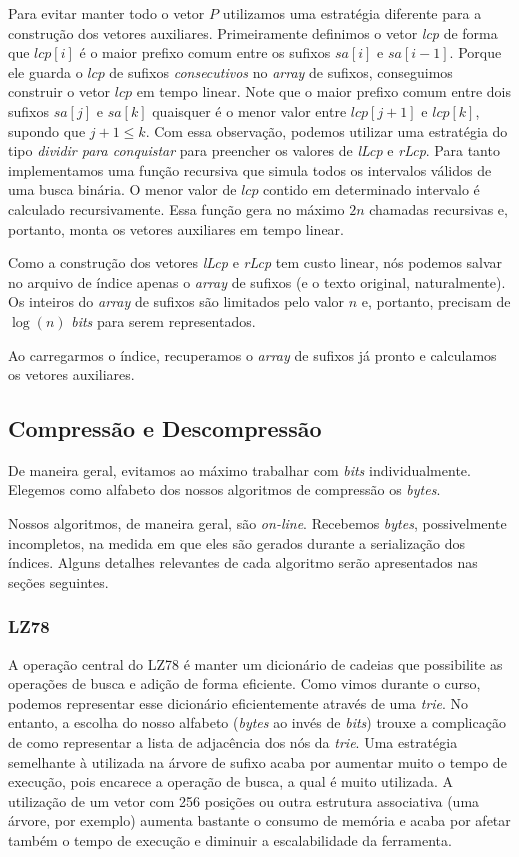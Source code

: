 \documentclass[]{article}
\begin{document}
Para evitar manter todo o vetor $P$ utilizamos uma estratégia diferente para a construção dos vetores auxiliares. Primeiramente definimos o vetor \textit{lcp} de forma que $lcp[i]$ é o maior prefixo comum entre os sufixos $sa[i]$ e $sa[i-1]$. Porque ele guarda o $lcp$ de sufixos \textit{consecutivos} no \textit{array} de sufixos, conseguimos construir o vetor $lcp$ em tempo linear. Note que o maior prefixo comum entre dois sufixos $sa[j]$ e $sa[k]$ quaisquer é o menor valor entre $lcp[j+1]$ e $lcp[k]$, supondo que $j+1 \leq k$. Com essa observação, podemos utilizar uma estratégia do tipo \textit{dividir para conquistar} para preencher os valores de \textit{lLcp} e \textit{rLcp}. Para tanto implementamos uma função recursiva que simula todos os intervalos válidos de uma busca binária. O menor valor de $lcp$ contido em determinado intervalo é calculado recursivamente. Essa função gera no máximo $2n$ chamadas recursivas e, portanto, monta os vetores auxiliares em tempo linear.

Como a construção dos vetores \textit{lLcp} e \textit{rLcp} tem custo linear, nós podemos salvar no arquivo de índice apenas o \textit{array} de sufixos (e o texto original, naturalmente). Os inteiros do \textit{array} de sufixos são limitados pelo valor $n$ e, portanto, precisam de $\log(n)$ \textit{bits} para serem representados. 

Ao carregarmos o índice, recuperamos o \textit{array} de sufixos já pronto e calculamos os vetores auxiliares.

\subsection{Compressão e Descompressão}

De maneira geral, evitamos ao máximo trabalhar com \textit{bits} individualmente. Elegemos como alfabeto dos nossos algoritmos de compressão os \textit{bytes}.

Nossos algoritmos, de maneira geral, são \textit{on-line}. Recebemos \textit{bytes}, possivelmente incompletos, na medida em que eles são gerados durante a serialização dos índices. Alguns detalhes relevantes de cada algoritmo serão apresentados nas seções seguintes.

\subsubsection{LZ78}

A operação central do LZ78 é manter um dicionário de cadeias que possibilite as operações de busca e adição de forma eficiente. Como vimos durante o curso, podemos representar esse dicionário eficientemente através de uma \textit{trie}. No entanto, a escolha do nosso alfabeto (\textit{bytes} ao invés de \textit{bits}) trouxe a complicação de como representar a lista de adjacência dos nós da \textit{trie}. Uma estratégia semelhante à utilizada na árvore de sufixo acaba por aumentar muito o tempo de execução, pois encarece a operação de busca, a qual é muito utilizada. A utilização de um vetor com 256 posições ou outra estrutura associativa (uma árvore, por exemplo) aumenta bastante o consumo de memória e acaba por afetar também o tempo de execução e diminuir a escalabilidade da ferramenta.
\end{document}
